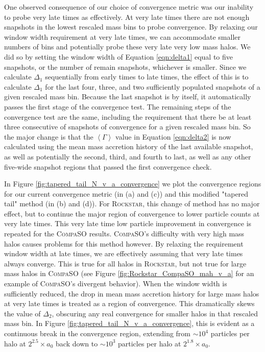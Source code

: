 One observed consequence of our choice of convergence metric was our inability to probe very late times as effectively. At very late times there are not enough snapshots in the lowest rescaled mass bins to probe convergence. By relaxing our window width requirement at very late times, we can accommodate smaller numbers of bins and potentially probe these very late very low mass halos. We did so by setting the window width of Equation \ref{eqn:delta1} equal to five snapshots, or the number of remain snapshots, whichever is smaller. Since we calculate $\Delta_1$ sequentially from early times to late times, the effect of this is to calculate $\Delta_1$ for the last four, three, and two sufficiently populated snapshots of a given rescaled mass bin. Because the last snapshot is by itself, it automatically passes the first stage of the convergence test. The remaining steps of the convergence test are the same, including the requirement that there be at least three consecutive of snapshots of convergence for a given rescaled mass bin. So the major change is that the $\left<\Gamma\right>$ value in Equation \ref{eqn:delta2} is now calculated using the mean mass accretion history of the last available snapshot, as well as potentially the second, third, and fourth to last, as well as any other five-wide snapshot regions that passed the first convergence check.

In Figure \ref{fig:tapered_tail_N_v_a_convergence} we plot the convergence regions for our current convergence metric (in (a) and (c)) and this modified "tapered tail" method (in (b) and (d)). For \textsc{Rockstar}, this change of method has no major effect, but to continue the major region of convergence to lower particle counts at very late times. This very late time low particle improvement in convergence is repeated for the \textsc{CompaSO} results. \textsc{CompaSO}'s difficulty with very high mass halos causes problems for this method however. By relaxing the requirement window width at late times, we are effectively assuming that very late times always converge. This is true for all halos in \textsc{Rockstar}, but not true for large mass halos in \textsc{CompaSO} (see Figure \ref{fig:Rockstar_CompaSO_mah_v_a} for an example of \textsc{CompaSO}'s divergent behavior). When the window width is sufficiently reduced, the drop in mean mass accretion history for large mass halos at very late times is treated as a region of convergence. This dramatically skews the value of $\Delta_2$, obscuring any real convergence for smaller halos in that rescaled mass bin. In Figure \ref{fig:tapered_tail_N_v_a_convergence}, this is evident as a continuous break in the convergence region, extending from $\sim10^4$ particles per halo at $2^{2.5}\times a_0$ back down to $\sim10^3$ particles per halo at $2^{1.8}\times a_0$.
